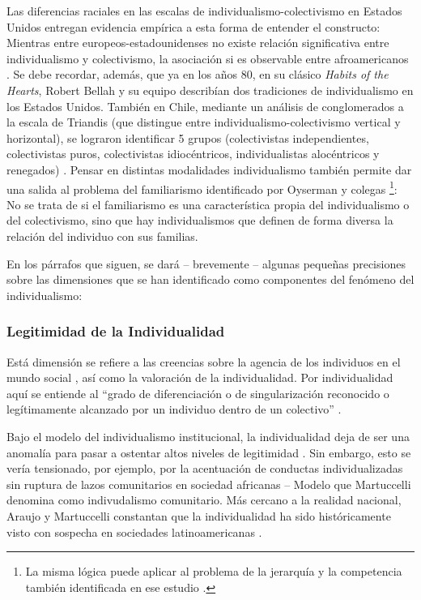 \documentclass[12pt,twoside]{templates/facsothesis}
\begin{document}
Las diferencias raciales en las escalas de individualismo-colectivismo en Estados Unidos \citep{oyserman2002, komarraju2008} entregan evidencia empírica a esta forma de entender el constructo: Mientras entre europeos-estadounidenses no existe relación significativa entre individualismo y colectivismo, la asociación si es observable entre afroamericanos \citep{komarraju2008}. Se debe recordar, además, que ya en los años 80, en su clásico \emph{Habits of the Hearts}, Robert Bellah y su equipo describían dos tradiciones de individualismo en los Estados Unidos. También en Chile, mediante un análisis de conglomerados a la escala de Triandis (que distingue entre individualismo-colectivismo vertical y horizontal), se lograron identificar 5 grupos (colectivistas independientes, colectivistas puros, colectivistas idiocéntricos, individualistas alocéntricos y renegados) \citep{rojas2008}. Pensar en distintas modalidades individualismo también permite dar una salida al problema del familiarismo identificado por Oyserman y colegas \citeyearpar{oyserman2002} \footnote{La misma lógica puede aplicar al problema de la jerarquía y la competencia también identificada en ese estudio \citep{oyserman2002}.}: No se trata de si el familiarismo es una característica propia del individualismo o del colectivismo, sino que hay individualismos que definen de forma diversa la relación del individuo con sus familias.

En los párrafos que siguen, se dará -- brevemente -- algunas pequeñas precisiones sobre las dimensiones que se han identificado como componentes del fenómeno del individualismo:

\hypertarget{legitimidad-de-la-individualidad}{%
\subsubsection{Legitimidad de la Individualidad}\label{legitimidad-de-la-individualidad}}

Está dimensión se refiere a las creencias sobre la agencia de los individuos en el mundo social \citep{brewer2007}, así como la valoración de la individualidad. Por individualidad aquí se entiende al ``grado de diferenciación o de singularización reconocido o legítimamente alcanzado por un individuo dentro de un colectivo'' \citep[p.~10]{martuccelli2018}.

Bajo el modelo del individualismo institucional, la individualidad deja de ser una anomalía para pasar a ostentar altos niveles de legitimidad \citep{martuccelli2018}. Sin embargo, esto se vería tensionado, por ejemplo, por la acentuación de conductas individualizadas sin ruptura de lazos comunitarios en sociedad africanas -- Modelo que Martuccelli \citeyearpar{martuccelli2018} denomina como indivudalismo comunitario. Más cercano a la realidad nacional, Araujo y Martuccelli constantan que la individualidad ha sido históricamente visto con sospecha en sociedades latinoamericanas \citep{araujo2020a}.
\end{document}
